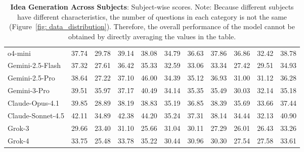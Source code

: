 \begin{table}[t]
{\begin{tabular}{lcccccccccc}
o4-mini & 37.74 & 29.78 & 39.14 & 38.08 & 34.79 & 36.63 & 37.86 & 36.86 & 32.42 & 38.78 \\
Gemini-2.5-Flash & 37.32 & 27.61 & 36.42 & 35.33 & 32.59 & 33.06 & 33.34 & 27.42 & 29.51 & 34.93 \\
Gemini-2.5-Pro & 38.64 & 27.22 & 37.10 & 46.00 & 34.39 & 35.12 & 36.93 & 31.00 & 31.12 & 36.28 \\
Gemini-3-Pro & 39.51 & 35.97 & 37.17 & 40.49 & 34.14 & 35.35 & 35.49 & 30.03 & 32.14 & 35.18 \\
Claude-Opus-4.1 & 39.85 & 28.89 & 38.19 & 38.83 & 35.19 & 36.85 & 38.39 & 35.69 & 33.66 & 37.44 \\
Claude-Sonnet-4.5 & 42.11 & 34.89 & 42.38 & 44.20 & 35.24 & 37.31 & 38.14 & 34.44 & 32.13 & 40.90 \\
Grok-3 & 29.66 & 23.40 & 31.10 & 25.66 & 31.04 & 30.11 & 27.29 & 26.01 & 26.43 & 33.26 \\
Grok-4 & 33.75 & 25.48 & 33.78 & 35.22 & 30.44 & 30.96 & 30.30 & 27.54 & 27.58 & 33.61 \\
\bottomrule
\end{tabular}
}
\caption{\textbf{Idea Generation Across Subjects}: Subject-wise scores. Note: Because different subjects have different characteristics, the number of questions in each category is not the same (Figure~\ref{fig: data_distribution}). Therefore, the overall performance of the model cannot be obtained by directly averaging the values in the table.}
\label{tab:idea_subject_metric_table}
\end{table}

